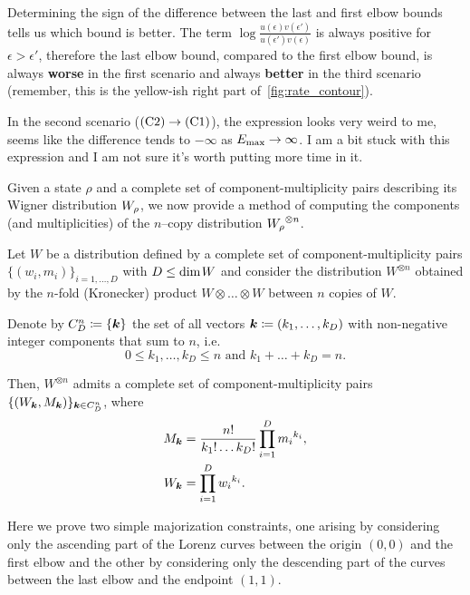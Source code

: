 \documentclass[pra,
aps,
twocolumn,
superscriptaddress,
groupedaddress,
nofootinbib,
reprint
]{revtex4-1}
\begin{document}
Determining the sign of the difference between the last and first elbow bounds tells us which bound is better.
The term $\log{\frac{u(\epsilon)v(\epsilon')}{u(\epsilon')v(\epsilon)}}$ is always positive for $\epsilon > \epsilon'$, therefore the last elbow bound, compared to the first elbow bound, is always \textbf{worse} in the first scenario and always \textbf{better} in the third scenario (remember, this is the yellow-ish right part of~\cref{fig:rate_contour}).

In the second scenario ($\rm{(C2)} \rightarrow \rm{(C1)}$), the expression looks very weird to me, seems like the difference tends to $-\infty$ as $E_{\rm{max}} \rightarrow \infty$.
I am a bit stuck with this expression and I am not sure it's worth putting more time in it.


Given a state $\rho$ and a complete set of component-multiplicity pairs describing its Wigner distribution $\W{\rho}$, we now provide a method of computing the components (and multiplicities) of the $n$--copy distribution $\W{\rho}^{\otimes n}$.
\begin{lemma}\label{lem:ncopycomponents}
	Let $W$ be a distribution defined by a complete set of component-multiplicity pairs $\{(w_i, m_i)\}_{i=1,\dots,D}$ with $D \leq {\rm{dim}}\hspace{1pt}W$ and consider the distribution $W^{\otimes n}$ obtained by the $n$-fold (Kronecker) product $W \otimes \dots \otimes W$ between $n$ copies of $W$.
	
	Denote by $C_D^n \coloneqq \{\bm{k}\}$ the set of all vectors $\bm{k} \coloneqq (k_1, \dots, k_D)$ with non-negative integer components that sum to $n$, i.e.
	\begin{equation*}
	0 \leq k_1, \dots, k_D \leq n \text{ and } k_1 + \dots + k_D = n.
	\end{equation*}
	
	Then, $W^{\otimes n}$ admits a complete set of component-multiplicity pairs $\{(W_{\bm{k}}, M_{\bm{k}})\}_{\bm{k} \in C_D^n}$, where
\begin{align}
	M_{\bm{k}} &= \frac{n!}{k_1!\dots k_D!} \prod\limits_{i=1}^D {m_i}^{k_i}, \label{eq:M}\\
	W_{\bm{k}} &= \prod\limits_{i=1}^D {w_i}^{k_i}. \label{eq:W}
\end{align}
\end{lemma}


Here we prove two simple majorization constraints, one arising by considering only the ascending part of the Lorenz curves between the origin $(0,0)$ and the first elbow and the other by considering only the descending part of the curves between the last elbow and the endpoint $(1,1)$.
\end{document}
